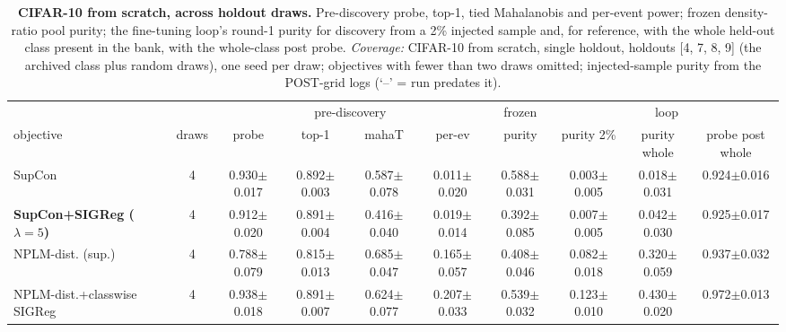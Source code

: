 \begin{landscape}
\begin{table}[p]
\centering
\footnotesize
\setlength{\tabcolsep}{3pt}
\begin{tabular}{lccccccccc}
\toprule
& & \multicolumn{4}{c}{pre-discovery} & frozen & \multicolumn{3}{c}{loop} \\
\cmidrule(lr){3-6}\cmidrule(lr){7-7}\cmidrule(lr){8-10}
objective & draws & probe & top-1 & mahaT & per-ev & purity & purity 2\% & purity whole & probe post whole \\
\midrule
SupCon & 4 & 0.930$\pm$0.017 & 0.892$\pm$0.003 & 0.587$\pm$0.078 & 0.011$\pm$0.020 & 0.588$\pm$0.031 & 0.003$\pm$0.005 & 0.018$\pm$0.031 & 0.924$\pm$0.016 \\
\textbf{SupCon+SIGReg ($\lambda{=}5$)} & 4 & 0.912$\pm$0.020 & 0.891$\pm$0.004 & 0.416$\pm$0.040 & 0.019$\pm$0.014 & 0.392$\pm$0.085 & 0.007$\pm$0.005 & 0.042$\pm$0.030 & 0.925$\pm$0.017 \\
NPLM-dist. (sup.) & 4 & 0.788$\pm$0.079 & 0.815$\pm$0.013 & 0.685$\pm$0.047 & 0.165$\pm$0.057 & 0.408$\pm$0.046 & 0.082$\pm$0.018 & 0.320$\pm$0.059 & 0.937$\pm$0.032 \\
NPLM-dist.+classwise SIGReg & 4 & 0.938$\pm$0.018 & 0.891$\pm$0.007 & 0.624$\pm$0.077 & 0.207$\pm$0.033 & 0.539$\pm$0.032 & 0.123$\pm$0.010 & 0.430$\pm$0.020 & 0.972$\pm$0.013 \\
\bottomrule
\end{tabular}
\caption{\textbf{CIFAR-10 from scratch, across holdout draws.} Pre-discovery probe, top-1, tied Mahalanobis and per-event power; frozen density-ratio pool purity; the fine-tuning loop's round-1 purity for discovery from a 2\% injected sample and, for reference, with the whole held-out class present in the bank, with the whole-class post probe. \emph{Coverage:} CIFAR-10 from scratch, single holdout, holdouts [4, 7, 8, 9] (the archived class plus random draws), one seed per draw; objectives with fewer than two draws omitted; injected-sample purity from the POST-grid logs (`--' = run predates it).}
\label{tab:app_cifar10_scratch_draws}
\end{table}
\end{landscape}
